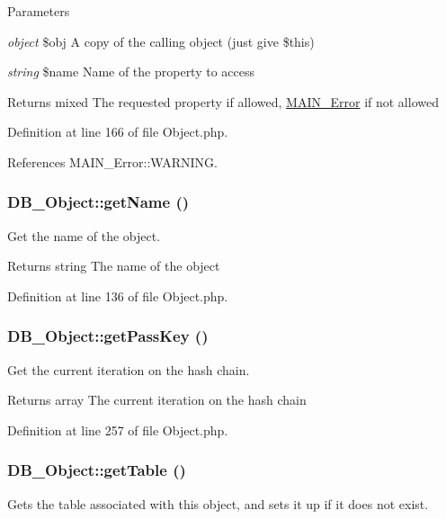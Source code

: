 \begin{DoxyParams}{Parameters}
\item[{\em object}]\$obj A copy of the calling object (just give \$this) \item[{\em string}]\$name Name of the property to access\end{DoxyParams}
\begin{DoxyReturn}{Returns}
mixed The requested property if allowed, \hyperlink{classMAIN__Error}{MAIN\_\-Error} if not allowed 
\end{DoxyReturn}


Definition at line 166 of file Object.php.

References MAIN\_\-Error::WARNING.\hypertarget{classDB__Object_a9e72ad4e667d0de2f3d2df0cc37c6463}{
\subsubsection[{getName}]{\setlength{\rightskip}{0pt plus 5cm}DB\_\-Object::getName ()}}
\label{dc/d6d/classDB__Object_a9e72ad4e667d0de2f3d2df0cc37c6463}
Get the name of the object.

\begin{DoxyReturn}{Returns}
string The name of the object 
\end{DoxyReturn}


Definition at line 136 of file Object.php.\hypertarget{classDB__Object_a2c2b7b97b2c73bee8d6d616fb51e297e}{
\subsubsection[{getPassKey}]{\setlength{\rightskip}{0pt plus 5cm}DB\_\-Object::getPassKey ()}}
\label{dc/d6d/classDB__Object_a2c2b7b97b2c73bee8d6d616fb51e297e}
Get the current iteration on the hash chain.

\begin{DoxyReturn}{Returns}
array The current iteration on the hash chain 
\end{DoxyReturn}


Definition at line 257 of file Object.php.\hypertarget{classDB__Object_a9924a8fa716e352e9528bf99f51a90fd}{
\subsubsection[{getTable}]{\setlength{\rightskip}{0pt plus 5cm}DB\_\-Object::getTable ()}}
\label{dc/d6d/classDB__Object_a9924a8fa716e352e9528bf99f51a90fd}
Gets the table associated with this object, and sets it up if it does not exist.

